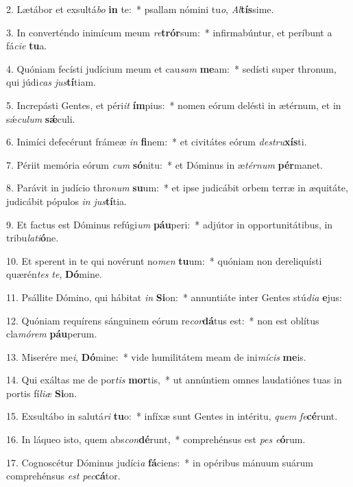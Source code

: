 2. Lætábor et exsultá\textit{bo} \textbf{in} te:~*  psallam nómini tu\textit{o}, \textit{Al}\textbf{tís}sime.\

3. In converténdo inimícum meum \textit{re}\textbf{trór}sum:~*  infirmabúntur, et períbunt a fá\textit{ci}\textit{e} \textbf{tu}a.\

4. Quóniam fecísti judícium meum et cau\textit{sam} \textbf{me}am:~*  sedísti super thronum, qui júdi\textit{cas} \textit{jus}\textbf{tí}tiam.\

5. Increpásti Gentes, et péri\textit{it} \textbf{ím}pius:~*  nomen eórum delésti in ætérnum, et in sǽ\textit{cu}\textit{lum} \textbf{sǽ}culi.\

6. Inimíci defecérunt frámeæ \textit{in} \textbf{fi}nem:~*  et civitátes eórum \textit{de}\textit{stru}\textbf{xís}ti.\

7. Périit memória eórum \textit{cum} \textbf{só}nitu:~*  et Dóminus in æ\textit{tér}\textit{num} \textbf{pér}manet.\

8. Parávit in judício thro\textit{num} \textbf{su}um:~*  et ipse judicábit orbem terræ in æquitáte, judicábit pópulos \textit{in} \textit{jus}\textbf{tí}tia.\

9. Et factus est Dóminus refúgi\textit{um} \textbf{páu}peri:~*  adjútor in opportunitátibus, in tribu\textit{la}\textit{ti}\textbf{ó}ne.\

10. Et sperent in te qui novérunt no\textit{men} \textbf{tu}um:~*  quóniam non dereliquísti quærén\textit{tes} \textit{te}, \textbf{Dó}mine.\

11. Psállite Dómino, qui hábitat \textit{in} \textbf{Si}on:~*  annuntiáte inter Gentes stú\textit{di}\textit{a} \textbf{e}jus:\

12. Quóniam requírens sánguinem eórum re\textit{cor}\textbf{dá}tus est:~*  non est oblítus cla\textit{mó}\textit{rem} \textbf{páu}perum.\

13. Miserére me\textit{i}, \textbf{Dó}mine:~*  vide humilitátem meam de ini\textit{mí}\textit{cis} \textbf{me}is.\

14. Qui exáltas me de por\textit{tis} \textbf{mor}tis,~*  ut annúntiem omnes laudatiónes tuas in portis fí\textit{li}\textit{æ} \textbf{Si}on.\

15. Exsultábo in salutá\textit{ri} \textbf{tu}o:~*  infíxæ sunt Gentes in intéritu, \textit{quem} \textit{fe}\textbf{cé}runt.\

16. In láqueo isto, quem abs\textit{con}\textbf{dé}runt,~*  comprehénsus est \textit{pes} \textit{e}\textbf{ó}rum.\

17. Cognoscétur Dóminus judíci\textit{a} \textbf{fá}ciens:~*  in opéribus mánuum suárum comprehénsus \textit{est} \textit{pec}\textbf{cá}tor.\

